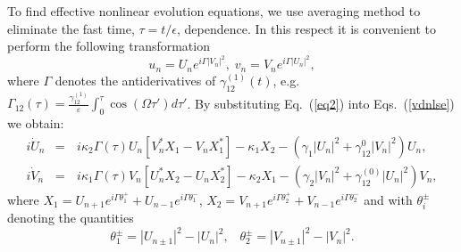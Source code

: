 \documentclass[12pt]{iopart}
\begin{document}
To find effective nonlinear evolution equations, we use averaging
method to eliminate the fast time, $\tau=t/\epsilon$, dependence.
In this respect it is convenient to perform the following transformation
\begin{equation}
u_{n}=U_{n}e^{i\Gamma|V_{n}|^{2}},\;v_{n}=V_{n}e^{i\Gamma|U_{n}|^{2}},\label{eq2}
\end{equation}
where $\Gamma$ denotes the antiderivatives of $\gamma_{12}^{(1)}(t)$,
e.g. $\Gamma_{12}(\tau)=\frac{\gamma_{12}^{(1)}}{\varepsilon}\int_{0}^{\tau}\cos(\Omega\tau')d\tau'$.
By substituting Eq.~(\ref{eq2}) into Eqs.~(\ref{vdnlse}) we obtain:
\begin{eqnarray}
i\dot{U}_{n}&= & \,i\kappa_{2}\Gamma(\tau)U_{n}[V_{n}^{\ast}X_{1}-V_{n}X_{1}^{*}]-
 \kappa_{1}X_{2}-(\gamma_{1}|U_{n}|^{2}+\gamma_{12}^{0}|V_{n}|^{2})U_{n},\\
i\dot{V}_{n}&= & \,i\kappa_{1}\Gamma(\tau)V_{n}[U_{n}^{\ast}X_{2}-U_{n}X_{2}^{*}]-
 \kappa_{2}X_{1}-(\gamma_{2}|V_{n}|^{2}+\gamma_{12}^{(0)}|U_{n}|^{2})V_{n},
\end{eqnarray}\label{eq.tr}
where $X_{1}=U_{n+1}e^{i\Gamma\theta_{1}^{+}}+U_{n-1}e^{i\Gamma\theta_{1}^{-}}$,
$X_{2}=V_{n+1}e^{i\Gamma\theta_{2}^{+}}+V_{n-1}e^{i\Gamma\theta_{2}^{-}}$
and with $\theta_{i}^{\pm}$ denoting the quantities
\begin{equation}
\theta_{1}^{\pm}=|U_{n\pm1}|^{2}-|U_{n}|^{2},\;\;\;\theta_{2}^{\pm}=|V_{n\pm1}|^{2}-|V_{n}|^{2}.
\end{equation}
\end{document}
